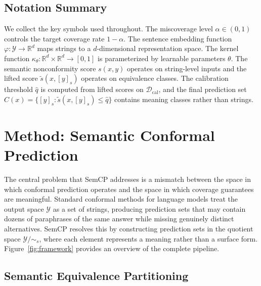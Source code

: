 \documentclass{article}
\begin{document}
\subsection{Notation Summary}

\label{sec:notation_summary}

We collect the key symbols used throughout. The miscoverage level $\alpha \in (0,1)$ controls the target coverage rate $1 - \alpha$. The sentence embedding function $\varphi: \mathcal{Y} \rightarrow \mathbb{R}^d$ maps strings to a $d$-dimensional representation space. The kernel function $\kappa_\theta: \mathbb{R}^d \times \mathbb{R}^d \rightarrow [0,1]$ is parameterized by learnable parameters $\theta$. The semantic nonconformity score $s(x, y)$ operates on string-level inputs and the lifted score $\tilde{s}(x, [y]_s)$ operates on equivalence classes. The calibration threshold $\hat{q}$ is computed from lifted scores on $\mathcal{D}_{\text{cal}}$, and the final prediction set $C(x) = \{[y]_s : \tilde{s}(x, [y]_s) \leq \hat{q}\}$ contains meaning classes rather than strings.

\section{Method: Semantic Conformal Prediction}

\label{sec:method_semantic_conformal_prediction}

The central problem that SemCP addresses is a mismatch between the space in which conformal prediction operates and the space in which coverage guarantees are meaningful. Standard conformal methods for language models treat the output space $\mathcal{Y}$ as a set of strings, producing prediction sets that may contain dozens of paraphrases of the same answer while missing genuinely distinct alternatives. SemCP resolves this by constructing prediction sets in the quotient space $\mathcal{Y}/{\sim_s}$, where each element represents a meaning rather than a surface form. Figure~\ref{fig:framework} provides an overview of the complete pipeline.



\subsection{Semantic Equivalence Partitioning}

\label{sec:semantic_equivalence_partitioning}
\end{document}
